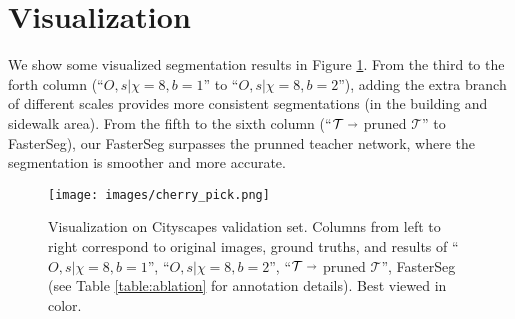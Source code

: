 \documentclass{article} \usepackage{iclr2020_conference,times}
\begin{document}
\section{Visualization}\vspace{-0.7em} \label{app:viz}
We show some visualized segmentation results in Figure \ref{fig:cherry_pick}. From the third to the forth column (``$O, s | \chi=8, b=1$'' to ``$O, s | \chi=8, b=2$''), adding the extra branch of different scales provides more consistent segmentations (in the building and sidewalk area). From the fifth to the sixth column (``$\mathcal{T} \shortrightarrow$ pruned $\mathcal{T}$'' to FasterSeg), our FasterSeg surpasses the prunned teacher network, where the segmentation is smoother and more accurate.

\begin{figure}[ht]
\texttt{[image: images/cherry\_pick.png]}
\centering \vspace{-0.1in}
\caption{Visualization on Cityscapes validation set. Columns from left to right correspond to original images, ground truths, and results of ``$O, s | \chi=8, b=1$'', ``$O, s | \chi=8, b=2$'', ``$\mathcal{T} \shortrightarrow$ pruned $\mathcal{T}$'', FasterSeg (see Table \ref{table:ablation} for annotation details). Best viewed in color.}
\label{fig:cherry_pick}
\end{figure}
\end{document}
